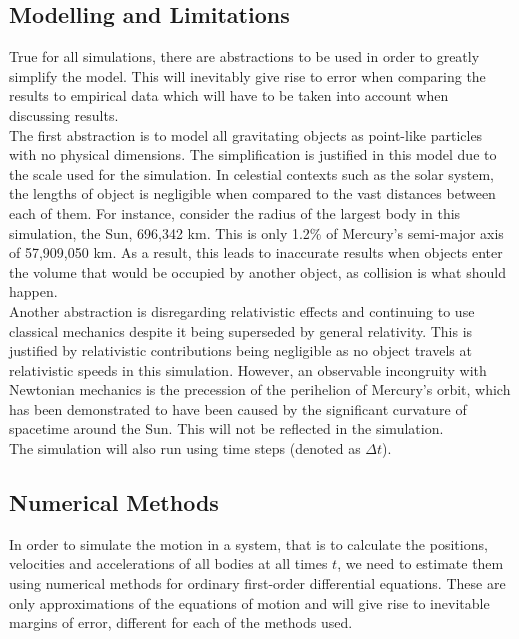 \documentclass[11pt]{article}
\begin{document}
    \subsection{Modelling and Limitations}\label{subsec:modelling}
    True for all simulations, there are abstractions to be used in order to greatly simplify the model.
    This will inevitably give rise to error when comparing the results to empirical data which will have to be taken into account when discussing results.\\
    The first abstraction is to model all gravitating objects as point-like particles with no physical dimensions.
    The simplification is justified in this model due to the scale used for the simulation.
    In celestial contexts such as the solar system, the lengths of object is negligible when compared to the vast distances between each of them.
    For instance, consider the radius of the largest body in this simulation, the Sun, 696,342 \si{km}\cite{2012ApJ...750..135E}.
    This is only 1.2\% of Mercury's semi-major axis of 57,909,050 \si{km}\cite{JPL2}.
    As a result, this leads to inaccurate results when objects enter the volume that would be occupied by another object, as collision is what should happen.\\
    Another abstraction is disregarding relativistic effects and continuing to use classical mechanics despite it being superseded by general relativity.
    This is justified by relativistic contributions being negligible as no object travels at relativistic speeds in this simulation.
    However, an observable incongruity with Newtonian mechanics is the precession of the perihelion of Mercury's orbit,
    which has been demonstrated to have been caused by the significant curvature of spacetime around the Sun\cite{1916AnP...354..769E}.
    This will not be reflected in the simulation.\\
    The simulation will also run using time steps (denoted as $\Delta t$).


    \subsection{Numerical Methods}\label{subsec:numerical-methods}
    In order to simulate the motion in a system, that is to calculate the positions, velocities and accelerations of all bodies at all times $t$,
    we need to estimate them using numerical methods for ordinary first-order differential equations.
    These are only approximations of the equations of motion and will give rise to inevitable margins of error, different for each of the methods used.
\end{document}
